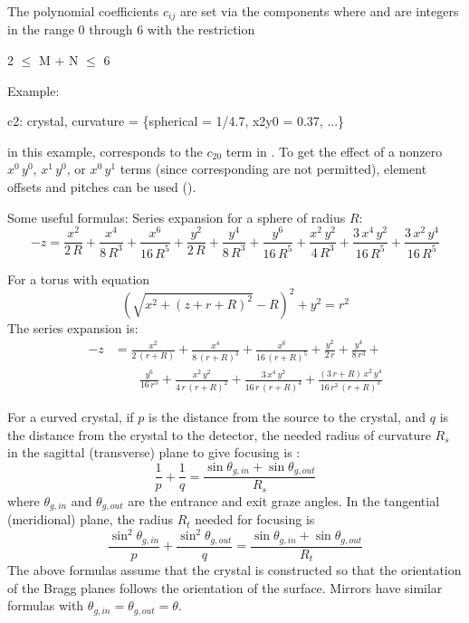 The polynomial coefficients $c_{ij}$ are set via the  components where  and 
are integers in the range 0 through 6 with the restriction
\begin{example}
  2 \(\le\) M + N \(\le\) 6
\end{example}
Example:
\begin{example}
  c2: crystal, curvature = \{spherical = 1/4.7, x2y0 = 0.37, ...\}
\end{example}
in this example,  corresponds to the $c_{20}$ term in . To get the
effect of a nonzero $x^0\, y^0$, $x^1 \, y^0$, or $x^0 \, y^1$ terms (since corresponding
  are not permitted), element offsets and pitches can be used ().

Some useful formulas: Series expansion for a sphere of radius $R$:
\begin{equation}
  {-z} = \frac{x^2}{2 \, R} + \frac{x^4}{8 \, R^3} + \frac{x^6}{16 \, R^5} +
         \frac{y^2}{2 \, R} + \frac{y^4}{8 \, R^3} + \frac{y^6}{16 \, R^5} +
         \frac{x^2 \, y^2}{4 \, R^3} + \frac{3 \, x^4 \, y^2}{16 \, R^5} +
         \frac{3 \, x^2 \, y^4}{16 \, R^5} 
\end{equation}

For a torus with equation
\begin{equation}
  \left( \sqrt{x^2 + (z + r + R)^2} - R \right)^2 + y^2 = r^2
\end{equation}
The series expansion is:
\begin{align}
  {-z} &= \frac{x^2}{2 \, (r+R)} + \frac{x^4}{8 \, (r+R)^3} + \frac{x^6}{16 \, (r+R)^5} + 
         \frac{y^2}{2 \, r} + \frac{y^4}{8 \, r^3} + \\
  & \qquad \frac{y^6}{16 \, r^5} +
         \frac{x^2 \, y^2}{4 \, r \, (r+R)^2} + \frac{3 \, x^4 \, y^2}{16 \, r \, (r + R)^4} + 
         \frac{(3 \, r + R) \, x^2 \, y^4}{16 \, r^3 \, (r + R)^3} \nonumber
\end{align}

For a curved crystal, if $p$ is the distance from the source to the crystal, and $q$ is the distance
from the crystal to the detector, the needed radius of curvature $R_s$ in the sagittal (transverse)
plane to give focusing is \cite{b:del.rio}:
\begin{equation}
  \frac{1}{p} + \frac{1}{q} = \frac{\sin\theta_{g,in} + \sin\theta_{g,out}}{R_s}
\end{equation}
where $\theta_{g,in}$ and $\theta_{g,out}$ are the entrance and exit graze angles. In the tangential
(meridional) plane, the radius $R_t$ needed for focusing is
\begin{equation}
  \frac{\sin^2\theta_{g,in}}{p} + \frac{\sin^2\theta_{g,out}}{q} = \frac{\sin\theta_{g,in} + \sin\theta_{g,out}}{R_t}
\end{equation}
The above formulas assume that the crystal is constructed so that the orientation of the Bragg planes
follows the orientation of the surface. Mirrors have similar formulas with $\theta_{g,in} =
\theta_{g,out} = \theta$.

